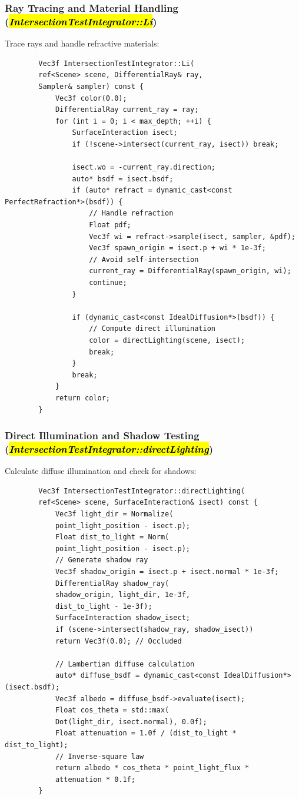 \documentclass[acmtog]{acmart}
\begin{document}
	\subsubsection{Ray Tracing and Material Handling (\hl{\textit{IntersectionTestIntegrator::Li}})}
	Trace rays and handle refractive materials:
	\begin{lstlisting}
		Vec3f IntersectionTestIntegrator::Li(
		ref<Scene> scene, DifferentialRay& ray, 
		Sampler& sampler) const {
			Vec3f color(0.0);
			DifferentialRay current_ray = ray;
			for (int i = 0; i < max_depth; ++i) {
				SurfaceInteraction isect;
				if (!scene->intersect(current_ray, isect)) break;
				
				isect.wo = -current_ray.direction;
				auto* bsdf = isect.bsdf;
				if (auto* refract = dynamic_cast<const PerfectRefraction*>(bsdf)) {
					// Handle refraction
					Float pdf;
					Vec3f wi = refract->sample(isect, sampler, &pdf);
					Vec3f spawn_origin = isect.p + wi * 1e-3f; 
					// Avoid self-intersection
					current_ray = DifferentialRay(spawn_origin, wi);
					continue;
				}
				
				if (dynamic_cast<const IdealDiffusion*>(bsdf)) {
					// Compute direct illumination
					color = directLighting(scene, isect);
					break;
				}
				break;
			}
			return color;
		}
	\end{lstlisting}
	
	\subsubsection{Direct Illumination and Shadow Testing (\hl{\textit{IntersectionTestIntegrator::directLighting}})}
	Calculate diffuse illumination and check for shadows:
	\begin{lstlisting}
		Vec3f IntersectionTestIntegrator::directLighting(
		ref<Scene> scene, SurfaceInteraction& isect) const {
			Vec3f light_dir = Normalize(
			point_light_position - isect.p);
			Float dist_to_light = Norm(
			point_light_position - isect.p);
			// Generate shadow ray
			Vec3f shadow_origin = isect.p + isect.normal * 1e-3f;
			DifferentialRay shadow_ray(
			shadow_origin, light_dir, 1e-3f, 
			dist_to_light - 1e-3f);
			SurfaceInteraction shadow_isect;
			if (scene->intersect(shadow_ray, shadow_isect)) 
			return Vec3f(0.0); // Occluded
			
			// Lambertian diffuse calculation
			auto* diffuse_bsdf = dynamic_cast<const IdealDiffusion*>(isect.bsdf);
			Vec3f albedo = diffuse_bsdf->evaluate(isect);
			Float cos_theta = std::max(
			Dot(light_dir, isect.normal), 0.0f);
			Float attenuation = 1.0f / (dist_to_light * dist_to_light); 
			// Inverse-square law
			return albedo * cos_theta * point_light_flux * 
			attenuation * 0.1f;
		}
	\end{lstlisting}
	
\end{document}
